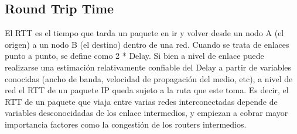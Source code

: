 \subsection {Round Trip Time}

El RTT es el tiempo que tarda un paquete en ir y volver desde un nodo A (el origen) a un nodo B (el destino) dentro de una red. 
Cuando se trata de enlaces punto a punto, se define como 2 * Delay. 
Si bien a nivel de enlace puede realizarse una estimación relativamente confiable del Delay a partir de variables conocidas (ancho de banda, velocidad de propagación del medio, etc), a nivel de red el RTT de un paquete IP queda sujeto a la ruta que este toma.
Es decir, el RTT de un paquete que viaja entre varias redes interconectadas depende de variables desconocidadas de los enlace intermedios, y empiezan a cobrar mayor importancia factores como la congestión de los routers intermedios.
	
